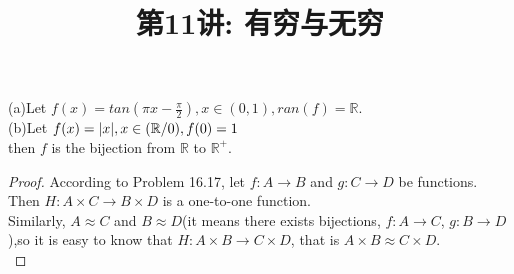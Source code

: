 \documentclass[a4paper, justified]{tufte-handout}
\title{第11讲: 有穷与无穷}
\date{\zhtoday} %
\begin{document}
\maketitle
\noplagiarism %
\begin{abstract}
  \begin{center}{}
  \end{center}
\end{abstract}
\beginrequired

\begin{problem}[UD Problem 21.6]
\end{problem}

\begin{solution}
  (a)Let $f(x) = tan(\pi x - \frac{\pi}{2}), x\in(0, 1), ran(f) = \mathbb{R}.$\\
  (b)Let $f(x) = |x|, x \in (\mathbb{R} / {0}),\\
    f(0) = 1$\\
  then $f$ is the bijection from $\mathbb{R}$ to $\mathbb{R}^+.$
\end{solution}

\begin{problem}[UD Problem 21.10]
\end{problem}

\begin{proof}
  According to Problem 16.17, let $f: A \rightarrow B$ and $g:C \rightarrow D$ be functions. Then $H:A\times C \rightarrow B \times D$ is a one-to-one function.\\
  Similarly, $A\approx C$ and $B\approx D$(it means there exists bijections, $f:A \rightarrow C$, $g:B \rightarrow D$),so it is easy to know that $H:A\times B \rightarrow C \times D$, that is $A\times B \approx C \times D$.\\
\end{proof}

\begin{problem}[UD Problem 22.10]
\end{problem}
\end{document}
